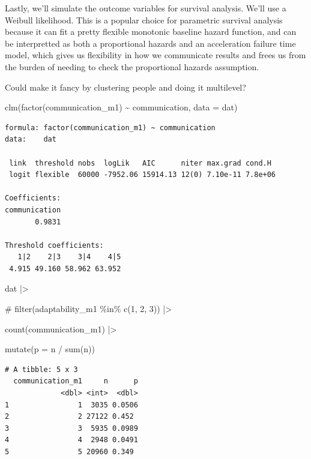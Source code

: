 \documentclass[
  letterpaper,
  DIV=11,
  numbers=noendperiod]{scrreprt}
\newenvironment{Shaded}{\begin{snugshade}}{\end{snugshade}}
\newcommand{\AttributeTok}[1]{\textcolor[rgb]{0.40,0.45,0.13}{#1}}
\newcommand{\CommentTok}[1]{\textcolor[rgb]{0.37,0.37,0.37}{#1}}
\newcommand{\FunctionTok}[1]{\textcolor[rgb]{0.28,0.35,0.67}{#1}}
\newcommand{\NormalTok}[1]{\textcolor[rgb]{0.00,0.23,0.31}{#1}}
\newcommand{\SpecialCharTok}[1]{\textcolor[rgb]{0.37,0.37,0.37}{#1}}
\begin{document}
Lastly, we'll simulate the outcome variables for survival analysis.
We'll use a Weibull likelihood. This is a popular choice for parametric
survival analysis because it can fit a pretty flexible monotonic
baseline hazard function, and can be interpretted as both a proportional
hazards and an acceleration failure time model, which gives us
flexibility in how we communicate results and frees us from the burden
of needing to check the proportional hazards assumption.

Could make it fancy by clustering people and doing it multilevel?

\begin{Shaded}
\begin{Highlighting}[]
\FunctionTok{clm}\NormalTok{(}\FunctionTok{factor}\NormalTok{(communication\_m1) }\SpecialCharTok{\textasciitilde{}}\NormalTok{ communication, }\AttributeTok{data =}\NormalTok{ dat)}
\end{Highlighting}
\end{Shaded}

\begin{verbatim}
formula: factor(communication_m1) ~ communication
data:    dat

 link  threshold nobs  logLik   AIC      niter max.grad cond.H 
 logit flexible  60000 -7952.06 15914.13 12(0) 7.10e-11 7.8e+06

Coefficients:
communication 
       0.9831 

Threshold coefficients:
   1|2    2|3    3|4    4|5 
 4.915 49.160 58.962 63.952 
\end{verbatim}

\begin{Shaded}
\begin{Highlighting}[]
\NormalTok{dat }\SpecialCharTok{|\textgreater{}} 

 \CommentTok{\#   filter(adaptability\_m1 \%in\% c(1, 2, 3)) |\textgreater{}}

    \FunctionTok{count}\NormalTok{(communication\_m1) }\SpecialCharTok{|\textgreater{}}

    \FunctionTok{mutate}\NormalTok{(}\AttributeTok{p =}\NormalTok{ n }\SpecialCharTok{/} \FunctionTok{sum}\NormalTok{(n))}
\end{Highlighting}
\end{Shaded}

\begin{verbatim}
# A tibble: 5 x 3
  communication_m1     n      p
             <dbl> <int>  <dbl>
1                1  3035 0.0506
2                2 27122 0.452 
3                3  5935 0.0989
4                4  2948 0.0491
5                5 20960 0.349 
\end{verbatim}
\end{document}
